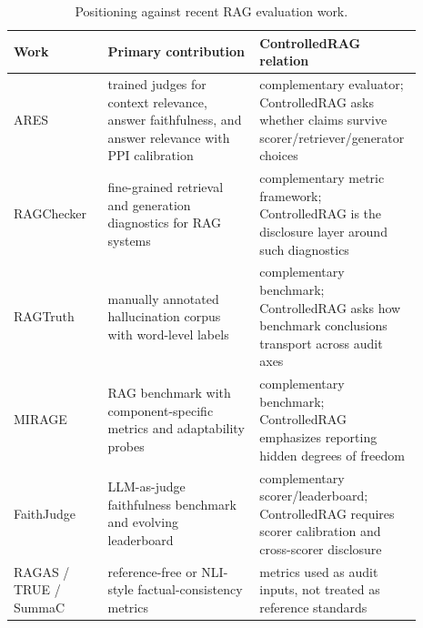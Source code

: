 \documentclass[11pt]{article}
\begin{document}
\begin{table}[!htb]
\centering
\caption{Positioning against recent RAG evaluation work.}
\label{tab:supp:related_positioning}
\scriptsize
\begin{tabular}{p{0.17\linewidth}p{0.36\linewidth}p{0.36\linewidth}}
\toprule
Work & Primary contribution & ControlledRAG relation \\
\midrule
ARES~\citep{saadfalcon2024ares} & trained judges for context relevance, answer faithfulness, and answer relevance with PPI calibration & complementary evaluator; ControlledRAG asks whether claims survive scorer/retriever/generator choices \\
RAGChecker~\citep{ru2024ragchecker} & fine-grained retrieval and generation diagnostics for RAG systems & complementary metric framework; ControlledRAG is the disclosure layer around such diagnostics \\
RAGTruth~\citep{niu2024ragtruth} & manually annotated hallucination corpus with word-level labels & complementary benchmark; ControlledRAG asks how benchmark conclusions transport across audit axes \\
MIRAGE~\citep{park2025mirage} & RAG benchmark with component-specific metrics and adaptability probes & complementary benchmark; ControlledRAG emphasizes reporting hidden degrees of freedom \\
FaithJudge~\citep{tamber2025faithjudge} & LLM-as-judge faithfulness benchmark and evolving leaderboard & complementary scorer/leaderboard; ControlledRAG requires scorer calibration and cross-scorer disclosure \\
RAGAS / TRUE / SummaC~\citep{es2024ragas,honovich2022true,laban2022summac} & reference-free or NLI-style factual-consistency metrics & metrics used as audit inputs, not treated as reference standards \\
\bottomrule
\end{tabular}
\end{table}



\end{document}
